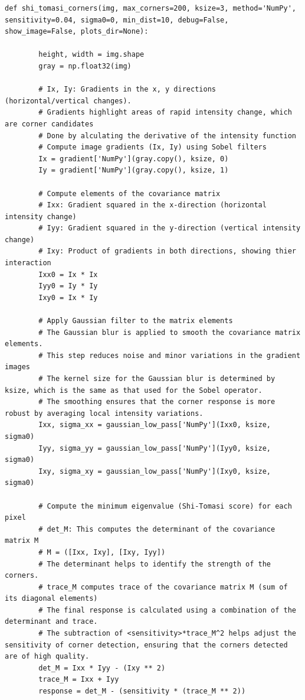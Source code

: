 \documentclass[11pt, conference, letterpaper]{IEEEtran}
\begin{document}
\onecolumn
\begin{lstlisting}[style=python, caption={Shi-Tomasi Corners Function}, label={lst:shi-tomasi}]
    def shi_tomasi_corners(img, max_corners=200, ksize=3, method='NumPy', sensitivity=0.04, sigma0=0, min_dist=10, debug=False, show_image=False, plots_dir=None):
    
        height, width = img.shape
        gray = np.float32(img)
            
        # Ix, Iy: Gradients in the x, y directions (horizontal/vertical changes).
        # Gradients highlight areas of rapid intensity change, which are corner candidates
        # Done by alculating the derivative of the intensity function
        # Compute image gradients (Ix, Iy) using Sobel filters
        Ix = gradient['NumPy'](gray.copy(), ksize, 0)
        Iy = gradient['NumPy'](gray.copy(), ksize, 1)
            
        # Compute elements of the covariance matrix
        # Ixx: Gradient squared in the x-direction (horizontal intensity change)
        # Iyy: Gradient squared in the y-direction (vertical intensity change)
        # Ixy: Product of gradients in both directions, showing thier interaction
        Ixx0 = Ix * Ix
        Iyy0 = Iy * Iy
        Ixy0 = Ix * Iy

        # Apply Gaussian filter to the matrix elements
        # The Gaussian blur is applied to smooth the covariance matrix elements. 
        # This step reduces noise and minor variations in the gradient images 
        # The kernel size for the Gaussian blur is determined by ksize, which is the same as that used for the Sobel operator. 
        # The smoothing ensures that the corner response is more robust by averaging local intensity variations.
        Ixx, sigma_xx = gaussian_low_pass['NumPy'](Ixx0, ksize, sigma0)
        Iyy, sigma_yy = gaussian_low_pass['NumPy'](Iyy0, ksize, sigma0)
        Ixy, sigma_xy = gaussian_low_pass['NumPy'](Ixy0, ksize, sigma0)
  
        # Compute the minimum eigenvalue (Shi-Tomasi score) for each pixel
        # det_M: This computes the determinant of the covariance matrix M
        # M = ([Ixx, Ixy], [Ixy, Iyy])
        # The determinant helps to identify the strength of the corners.
        # trace_M computes trace of the covariance matrix M (sum of its diagonal elements)
        # The final response is calculated using a combination of the determinant and trace.
        # The subtraction of <sensitivity>*trace_M^2 helps adjust the sensitivity of corner detection, ensuring that the corners detected are of high quality.
        det_M = Ixx * Iyy - (Ixy ** 2)
        trace_M = Ixx + Iyy
        response = det_M - (sensitivity * (trace_M ** 2))


\end{lstlisting}
\end{document}
